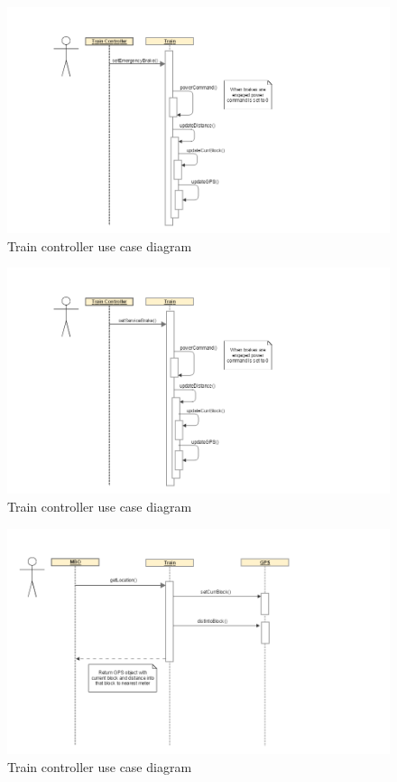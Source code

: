 \documentclass[]{article}
\begin{document}
\begin{figure}[H]
	\centering
	\includegraphics[scale=.2]{train_model_sqd_engage_emergency_brake.png}
	\caption{Train controller use case diagram}
\end{figure}

\begin{figure}[H]
	\centering
	\includegraphics[scale=.2]{train_model_sqd_engage_service_brake.png}
	\caption{Train controller use case diagram}
\end{figure}

\begin{figure}[H]
	\centering
	\includegraphics[scale=.2]{train_model_sqd_get_location.png}
	\caption{Train controller use case diagram}
\end{figure}
\end{document}
